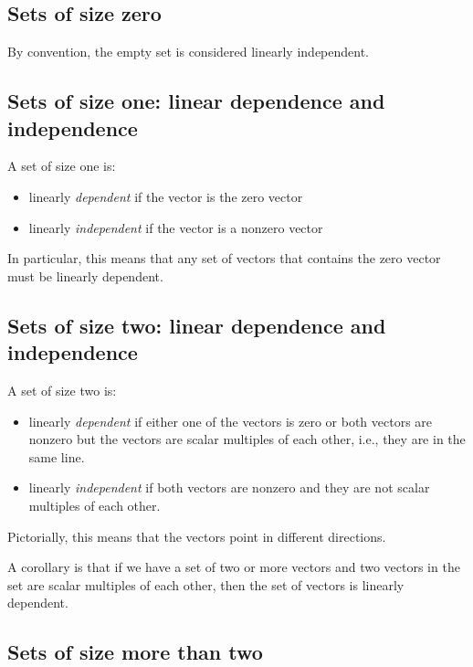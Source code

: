 \documentclass[10pt]{amsart}
\begin{document}
\subsection{Sets of size zero}

By convention, the empty set is considered linearly independent.

\subsection{Sets of size one: linear dependence and independence}

A set of size one is:

\begin{itemize}
\item linearly {\em dependent} if the vector is the zero vector
\item linearly {\em independent} if the vector is a nonzero vector
\end{itemize}

In particular, this means that any set of vectors that contains the
zero vector must be linearly dependent.

\subsection{Sets of size two: linear dependence and independence}

A set of size two is:

\begin{itemize}
\item linearly {\em dependent} if either one of the vectors is zero or
  both vectors are nonzero but the vectors are scalar multiples of
  each other, i.e., they are in the same line.
\item linearly {\em independent} if both vectors are nonzero and they
  are not scalar multiples of each other.
\end{itemize}

Pictorially, this means that the vectors point in different
directions.

A corollary is that if we have a set of two or more vectors and two
vectors in the set are scalar multiples of each other, then the set of
vectors is linearly dependent.

\subsection{Sets of size more than two}
\end{document}
